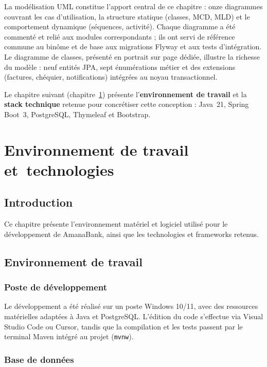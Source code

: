 \documentclass[11pt,a4paper,oneside]{report}
\newcommand{\nomapplication}{AmanaBank}
\begin{document}
La modélisation UML constitue l'apport central de ce chapitre : onze diagrammes couvrant les cas d'utilisation, la structure statique (classes, MCD, MLD) et le comportement dynamique (séquences, activité). Chaque diagramme a été commenté et relié aux modules correspondants ; ils ont servi de référence commune au binôme et de base aux migrations Flyway et aux tests d'intégration. Le diagramme de classes, présenté en portrait sur page dédiée, illustre la richesse du modèle : neuf entités JPA, sept énumérations métier et des extensions (factures, chéquier, notifications) intégrées au noyau transactionnel.

Le chapitre suivant (chapitre~\ref{ch:techno}) présente l'\textbf{environnement de travail} et la \textbf{stack technique} retenue pour concrétiser cette conception : Java~21, Spring Boot~3, PostgreSQL, Thymeleaf et Bootstrap.

\chapter{Environnement de travail et~technologies}
\label{ch:techno}

\section{Introduction}

Ce chapitre présente l'environnement matériel et logiciel utilisé pour le développement de \nomapplication, ainsi que les technologies et frameworks retenus.

\section{Environnement de travail}

\subsection{Poste de développement}

Le développement a été réalisé sur un poste Windows 10/11, avec des ressources matérielles adaptées à Java et PostgreSQL. L'édition du code s'effectue via Visual Studio Code ou Cursor, tandis que la compilation et les tests passent par le terminal Maven intégré au projet (\texttt{mvnw}).

\subsection{Base de données}
\end{document}
